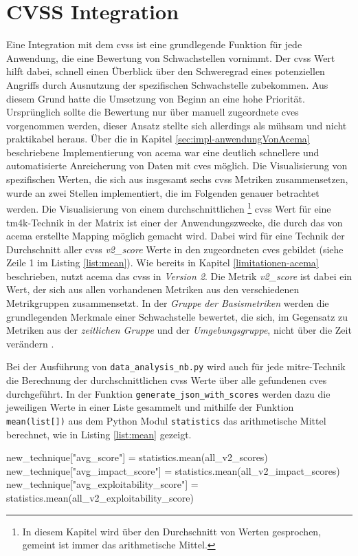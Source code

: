 \section{CVSS Integration} 
\label{sec:impl-cvssIntegration}
Eine Integration mit dem \gls{cvss} ist eine grundlegende Funktion für jede Anwendung, die eine Bewertung von Schwachstellen vornimmt. Der \gls{cvss} Wert hilft dabei, schnell einen Überblick über den Schweregrad eines potenziellen Angriffs durch Ausnutzung der spezifischen Schwachstelle zubekommen. Aus diesem Grund hatte die Umsetzung von Beginn an eine hohe Priorität. Ursprünglich sollte die Bewertung nur über manuell zugeordnete \glspl{cve} vorgenommen werden, dieser Ansatz stellte sich allerdings als mühsam und nicht praktikabel heraus. Über die in Kapitel \ref{sec:impl-anwendungVonAcema} beschriebene Implementierung von \gls{acema} war eine deutlich schnellere und automatisierte Anreicherung von Daten mit \glspl{cve} möglich. Die Visualisierung von spezifischen Werten, die sich aus insgesamt sechs \gls{cvss} Metriken zusammensetzen, wurde an zwei Stellen implementiert, die im Folgenden genauer betrachtet werden.
Die Visualisierung von einem durchschnittlichen \footnote{In diesem Kapitel wird über den Durchschnitt von Werten gesprochen, gemeint ist immer das arithmetische Mittel.} \gls{cvss} Wert für eine \gls{tm4k}-Technik in der Matrix ist einer der Anwendungszwecke, die durch das von \gls{acema} erstellte Mapping möglich gemacht wird. Dabei wird für eine Technik der Durchschnitt aller \gls{cvss} \textit{v2\_score} Werte in den zugeordneten \glspl{cve} gebildet (siehe Zeile 1 im Listing \ref{list:mean}).  Wie bereits in Kapitel \ref{limitationen-acema} beschrieben, nutzt \gls{acema} das \gls{cvss} in \textit{Version 2}. Die Metrik \textit{v2\_score} ist dabei ein Wert, der sich aus allen vorhandenen Metriken aus den verschiedenen Metrikgruppen zusammensetzt. In der \textit{Gruppe der Basismetriken} werden die grundlegenden Merkmale einer Schwachstelle bewertet, die sich, im Gegensatz zu Metriken aus der \textit{zeitlichen Gruppe} und der \textit{Umgebungsgruppe}, nicht über die Zeit verändern \autocite{CVSSV2Complete}.

Bei der Ausführung von \verb|data_analysis_nb.py| wird auch für jede \gls{mitre}-Technik die Berechnung der durchschnittlichen \gls{cvss} Werte über alle gefundenen \glspl{cve} durchgeführt. In der Funktion \verb|generate_json_with_scores| werden dazu die jeweiligen Werte in einer Liste gesammelt und mithilfe der Funktion \verb|mean(list[])| aus dem Python Modul \verb|statistics| das arithmetische Mittel berechnet, wie in Listing \ref{list:mean} gezeigt.
\begin{code}[caption=Berechnung des arithmetischen Mittels aus den CVSS Metriken mehrerer CVEs]
    new_technique["avg_score"] = statistics.mean(all_v2_scores)
    new_technique["avg_impact_score"] = statistics.mean(all_v2_impact_scores)
    new_technique["avg_exploitability_score"] = statistics.mean(all_v2_exploitability_score)
\end{code}
\label{list:mean}

